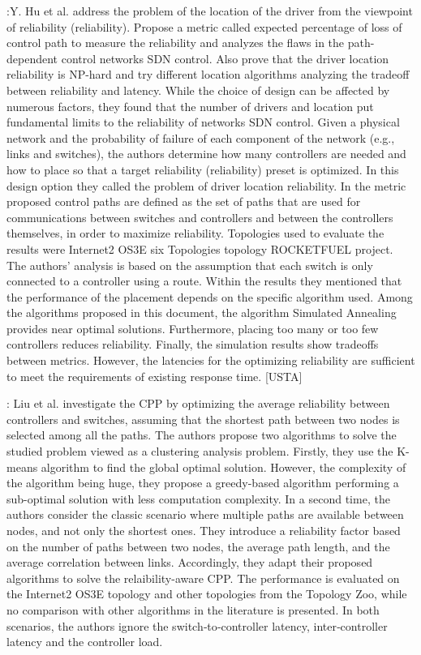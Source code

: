 \documentclass[a4paper,10pt]{article}
\begin{document}
\cite{HuWa14}:Y. Hu et al. address the problem of the location of the driver from the viewpoint of reliability (reliability). Propose a metric called expected percentage of loss of control path to measure the reliability and analyzes the flaws in the path-dependent control networks SDN control. Also prove that the driver location reliability is NP-hard and try different location algorithms analyzing the tradeoff between reliability and latency. While the choice of design can be affected by numerous factors, they found that the number of drivers and location put fundamental limits to the reliability of networks SDN control. Given a physical network and the probability of failure of each component of the network (e.g., links and switches), the authors determine how many controllers are needed and how to place so that a target reliability (reliability) preset is optimized. In this design option they called the problem of driver location reliability. In the metric proposed control paths are defined as the set of paths that are used for communications between switches and controllers and between the controllers themselves, in order to maximize reliability.
Topologies used to evaluate the results were Internet2 OS3E six Topologies topology ROCKETFUEL project. The authors' analysis is based on the assumption that each switch is only connected to a controller using a route. Within the results they mentioned that the performance of the placement depends on the specific algorithm used. Among the algorithms proposed in this document, the algorithm Simulated Annealing provides near optimal solutions. Furthermore, placing too many or too few controllers reduces reliability. Finally, the simulation results show tradeoffs between metrics. However, the latencies for the optimizing reliability are sufficient to meet the requirements of existing response time. [USTA]


\cite{LiLi16}: Liu et al. investigate the CPP by optimizing the average reliability between controllers and switches, assuming that the shortest path between two nodes is selected among all the paths. The authors propose two algorithms to solve the studied problem viewed as a clustering analysis problem. Firstly, they use the K-means algorithm to find the global optimal solution. However, the complexity of the algorithm being huge, they propose a greedy-based algorithm performing a sub-optimal solution with less computation complexity. In a second time, the authors consider the classic scenario where multiple paths are available between nodes, and not only the shortest ones. They introduce a reliability factor based on the number of paths between two nodes, the average path length, and the average correlation between links. Accordingly, they adapt their proposed algorithms to solve the relaibility-aware CPP. The performance is evaluated on the Internet2 OS3E topology and other topologies from the Topology Zoo, while no comparison with other algorithms in the literature is presented. In both scenarios, the authors ignore the switch‐to‐controller latency, inter‐controller latency and the controller load.
\end{document}
